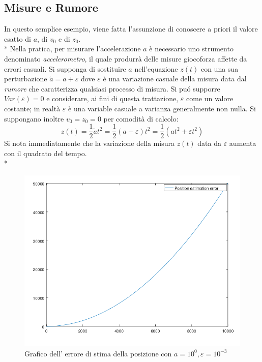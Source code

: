 \subsection{Misure e Rumore}
In questo semplice esempio, viene fatta l'assunzione di conoscere a priori il valore esatto di $a$, di $v_0$ e di $z_0$.\\*
Nella pratica, per misurare l'accelerazione $a$ \`e necessario uno strumento denominato \emph{accelerometro}, il quale produrr\`a delle misure giocoforza affette da errori casuali. Si supponga di sostituire $a$ nell'equazione $z(t)$ con una sua perturbazione $\tilde{a} = a + \varepsilon$ dove $\varepsilon$ \`e una variazione casuale della misura data dal \emph{rumore} che caratterizza qualsiasi processo di misura. Si pu\'o supporre $Var(\varepsilon) = 0$ e considerare, ai fini di questa trattazione, $\varepsilon$ come un valore costante; in realt\`a $\varepsilon$ \`e una variable casuale a varianza generalmente non nulla. Si suppongano inoltre $v_0 = z_0 = 0$ per comodit\`a di calcolo:
$$
z(t) = \frac{1}{2} \tilde{a} t^2 = \frac{1}{2}(a + \varepsilon) t^2 = \frac{1}{2} \left(at^2 + \varepsilon t^2\right)
$$
Si nota immediatamente che la variazione della misura $z(t)$ data da $\varepsilon$ aumenta con il quadrato del tempo.\\*
\begin{figure}[h]
	\centering
	\includegraphics[scale=0.5]{img/errormeas}
	\caption{Grafico dell' errore di stima della posizione con $a = 10^0, \varepsilon = 10^{-3}$}
	\label{fig:errormeas}
\end{figure}
\newpage
